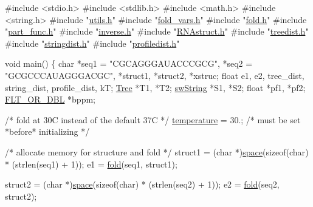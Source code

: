 \begin{DoxyCodeInclude}
\textcolor{preprocessor}{#include  <stdio.h>}
\textcolor{preprocessor}{#include  <stdlib.h>}
\textcolor{preprocessor}{#include  <math.h>}
\textcolor{preprocessor}{#include  <string.h>}
\textcolor{preprocessor}{#include  "\mbox{\hyperlink{utils_8h}{utils.h}}"}
\textcolor{preprocessor}{#include  "\mbox{\hyperlink{fold__vars_8h}{fold\_vars.h}}"}
\textcolor{preprocessor}{#include  "\mbox{\hyperlink{fold_8h}{fold.h}}"}
\textcolor{preprocessor}{#include  "\mbox{\hyperlink{part__func_8h}{part\_func.h}}"}
\textcolor{preprocessor}{#include  "\mbox{\hyperlink{inverse_8h}{inverse.h}}"}
\textcolor{preprocessor}{#include  "\mbox{\hyperlink{_r_n_astruct_8h}{RNAstruct.h}}"}
\textcolor{preprocessor}{#include  "\mbox{\hyperlink{treedist_8h}{treedist.h}}"}
\textcolor{preprocessor}{#include  "\mbox{\hyperlink{stringdist_8h}{stringdist.h}}"}
\textcolor{preprocessor}{#include  "\mbox{\hyperlink{profiledist_8h}{profiledist.h}}"}

\textcolor{keywordtype}{void}
main()
\{
  \textcolor{keywordtype}{char}        *seq1 = \textcolor{stringliteral}{"CGCAGGGAUACCCGCG"}, *seq2 = \textcolor{stringliteral}{"GCGCCCAUAGGGACGC"},
              *struct1, *struct2, *xstruc;
  \textcolor{keywordtype}{float}       e1, e2, tree\_dist, string\_dist, profile\_dist, kT;
  \mbox{\hyperlink{struct_tree}{Tree}}        *T1, *T2;
  \mbox{\hyperlink{structsw_string}{swString}}    *S1, *S2;
  \textcolor{keywordtype}{float}       *pf1, *pf2;
  \mbox{\hyperlink{group__data__structures_ga31125aeace516926bf7f251f759b6126}{FLT\_OR\_DBL}}  *bppm;

  \textcolor{comment}{/* fold at 30C instead of the default 37C */}
  \mbox{\hyperlink{group__model__details_gab4b11c8d9c758430960896bc3fe82ead}{temperature}} = 30.;       \textcolor{comment}{/* must be set *before* initializing  */}

  \textcolor{comment}{/* allocate memory for structure and fold */}
  struct1 = (\textcolor{keywordtype}{char} *)\mbox{\hyperlink{utils_8h_ad7e1e137b3bf1f7108933d302a7f0177}{space}}(\textcolor{keyword}{sizeof}(\textcolor{keywordtype}{char}) * (strlen(seq1) + 1));
  e1      = \mbox{\hyperlink{group__mfe__fold__single_gaadafcb0f140795ae62e5ca027e335a9b}{fold}}(seq1, struct1);

  struct2 = (\textcolor{keywordtype}{char} *)\mbox{\hyperlink{utils_8h_ad7e1e137b3bf1f7108933d302a7f0177}{space}}(\textcolor{keyword}{sizeof}(\textcolor{keywordtype}{char}) * (strlen(seq2) + 1));
  e2      = \mbox{\hyperlink{group__mfe__fold__single_gaadafcb0f140795ae62e5ca027e335a9b}{fold}}(seq2, struct2);


\end{DoxyCodeInclude}
